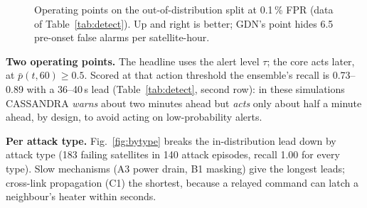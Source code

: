 \documentclass[conference]{IEEEtran}
\begin{document}
\begin{figure}[t]
\centering
{}
\caption{Operating points on the out-of-distribution split at 0.1\,\% FPR (data of
Table~\ref{tab:detect}). Up and right is better; GDN's point hides 6.5 pre-onset false alarms per
satellite-hour.}
\label{fig:operating}
\end{figure}

\textbf{Two operating points.} The headline uses the alert level $\tau$; the core acts later, at
$\bar p(t,60)\ge 0.5$. Scored at that action threshold the ensemble's recall is 0.73--0.89 with a 36--40\,s
lead (Table~\ref{tab:detect}, second row): in these simulations CASSANDRA \emph{warns} about two
minutes ahead but \emph{acts} only about half a minute ahead, by design, to avoid acting on
low-probability alerts.

\textbf{Per attack type.} Fig.~\ref{fig:bytype} breaks the in-distribution lead down by attack type
(183 failing satellites in 140 attack episodes, recall 1.00 for every type). Slow mechanisms (A3 power
drain, B1 masking) give the longest leads; cross-link propagation (C1) the shortest, because a relayed
command can latch a neighbour's heater within seconds.
\end{document}

